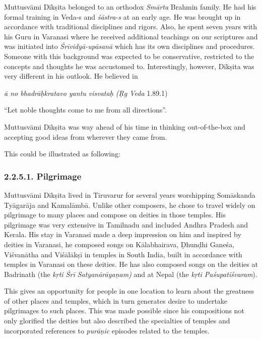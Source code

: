 Muttusvāmi Dīkṣita belonged to an orthodox \textit{Smārta} Brahmin family. He had his formal training in Veda-s and \textit{śāstra-s} at an early age. He was brought up in accordance with traditional disciplines and rigors. Also, he spent seven years with his Guru in Varanasi where he received additional teachings on our scriptures and was initiated into \textit{Śrīvidyā-upāsanā} which has its own disciplines and procedures. Someone with this background was expected to be conservative, restricted to the concepts and thoughts he was accustomed to. Interestingly, however, Dīkṣita was very different in his outlook. He believed in

\begin{myquote}
\textit{ā no bhadrāḥkratavo yantu visvataḥ (Ṛg Veda} 1.89.1)
\end{myquote}

“Let noble thoughts come to me from all directions”.

Muttusvāmi Dīkṣita was way ahead of his time in thinking out-of-the-box and accepting good ideas from wherever they came from.

This could be illustrated as following:

\subsubsection*{2.2.5.1. Pilgrimage}

Muttusvāmi Dīkṣita lived in Tiruvarur for several years worshipping Somāskanda Tyāgarāja and Kamalāmbā. Unlike other composers, he chose to travel widely on pilgrimage to many places and compose on deities in those temples. His pilgrimage was very extensive in Tamilnadu and included Andhra Pradesh and Kerala. His stay in Varanasi made a deep impression on him and inspired by deities in Varanasi, he composed songs on Kālabhairava, Ḍhunḍhi Ganeśa, Viśvanātha and Viśālākṣī in temples in South India, built in accordance with temples in Varanasi on these deities. He has also composed songs on the deities at Badrinath (the \textit{kṛti Śrī Satyanārāyaṇam)} and at Nepal (the\textit{ kṛti Paśupatīśvaram}).

This gives an opportunity for people in one location to learn about the greatness of other places and temples, which in turn generates desire to undertake pilgrimages to such places. This was made possible since his compositions not only glorified the deities but also described the specialties of temples and incorporated references to \textit{purāṇic} episodes related to the temples.

